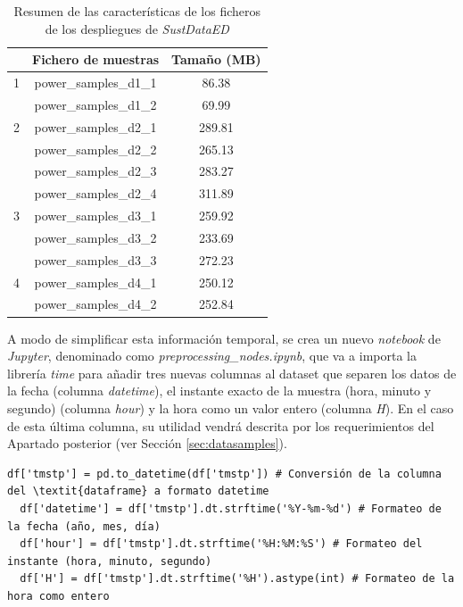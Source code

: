 \begin{table}[h!]
    \centering
    \begin{tabular}{|c|c|c|}
    \hline
    \rowcolor[HTML]{C0C0C0}
    \multicolumn{1}{|l|}{\cellcolor[HTML]{C0C0C0}Despliegue} & Fichero de muestras & \multicolumn{1}{l|}{\cellcolor[HTML]{C0C0C0}Tamaño (MB)} \\
    \hline
    1 & power\_samples\_d1\_1 & 86.38 \\
      & power\_samples\_d1\_2 & 69.99 \\
    \hline
    2 & power\_samples\_d2\_1 & 289.81 \\
      & power\_samples\_d2\_2 & 265.13 \\
      & power\_samples\_d2\_3 & 283.27 \\
      & power\_samples\_d2\_4 & 311.89 \\
    \hline
    3 & power\_samples\_d3\_1 & 259.92 \\
      & power\_samples\_d3\_2 & 233.69 \\
      & power\_samples\_d3\_3 & 272.23 \\
    \hline
    4 & power\_samples\_d4\_1 & 250.12 \\
      & power\_samples\_d4\_2 & 252.84 \\
    \hline
    \end{tabular}
    \caption{Resumen de las características de los ficheros de los despliegues de \textit{SustDataED}}
    \label{tab:fichconsumo}
\end{table}

\vspace{3mm}

A modo de simplificar esta información temporal, se crea un nuevo \textit{notebook} de \textit{Jupyter}, denominado como \textit{preprocessing\_nodes.ipynb}, que va a importa la librería \textit{time} para añadir tres nuevas columnas al dataset que separen los datos de la fecha (columna \textit{datetime}), el instante exacto de la muestra (hora, minuto y segundo) (columna \textit{hour}) y la hora como un valor entero (columna \textit{H}). En el caso de esta última columna, su utilidad vendrá descrita por los requerimientos del Apartado posterior (ver Sección \ref{sec:datasamples}).

\vspace{3mm}

\begin{lstlisting}[style=Python-color, caption={Formato del timestamp}]
  df['tmstp'] = pd.to_datetime(df['tmstp']) # Conversión de la columna del \textit{dataframe} a formato datetime
  df['datetime'] = df['tmstp'].dt.strftime('%Y-%m-%d') # Formateo de la fecha (año, mes, día)
  df['hour'] = df['tmstp'].dt.strftime('%H:%M:%S') # Formateo del instante (hora, minuto, segundo)
  df['H'] = df['tmstp'].dt.strftime('%H').astype(int) # Formateo de la hora como entero
\end{lstlisting}

